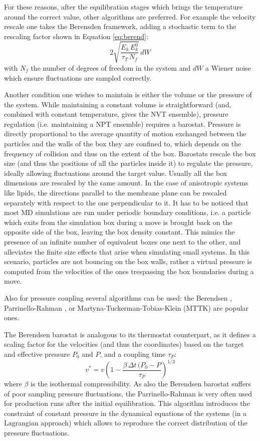 \documentclass[graybox]{svmult}
\begin{document}
For these reasons, after the equilibration stages which brings the temperature around the correct value, other algorithms are preferred. For example the velocity rescale one \cite{Bussi2007} takes the Berensden framework, adding a stochastic term to the rescaling factor shown in Equation \ref{eq:berend}:
\begin{equation}
    2 \sqrt{\frac{E_k\,E_k^0}{\tau_T\,N_f}}\, dW
\end{equation}
with $N_f$ the number of degrees of freedom in the system and $dW$ a Wiener noise \citep{Durrett2010} which ensure fluctuations are sampled correctly.

Another condition one wishes to maintain is either the volume or the pressure of the system. While maintaining a constant volume is straightforward (and, combined with constant temperature, gives the NVT ensemble), pressure regulation (i.e. maintaining a NPT ensemble) requires a barostat.
%
Pressure is directly proportional to the average quantity of motion exchanged between the particles and the walls of the box they are confined to, which depends on the frequency of collision and thus on the extent of the box. Barostats rescale the box size (and thus the positions of all the particles inside it) to regulate the pressure, ideally allowing fluctuations around the target value.
%
Usually all the box dimensions are rescaled by the same amount. In the case of anisotropic systems like lipids, the directions parallel to the membrane plane can be rescaled separately with respect to the one perpendicular to it.
%
It has to be noticed that most MD simulations are run under periodic boundary conditions, i.e. a particle which exits from the simulation box during a move is brought back on the opposite side of the box, leaving the box density constant. This mimics the presence of an infinite number of equivalent boxes one next to the other, and alleviates the finite size effects that arise when simulating small systems.
%
In this scenario, particles are not bouncing on the box walls, rather a virtual pressure is computed from the velocities of the ones trespassing the box boundaries during a move.

Also for pressure coupling several algorithms can be used: the Berendsen \cite{Berendsen1984}, Parrinello-Rahman \cite{Parrinello1981}, or Martyna-Tuckerman-Tobias-Klein (MTTK) \cite{Martyna1996} are popular ones.

The Berendsen barostat is analogous to its thermostat counterpart, as it defines a scaling factor for the velocities (and thus the coordinates) based on the target and effective pressure $P_0$ and $P$, and a coupling time $\tau_P$:
\begin{equation}
    v^* = v \left( 1 - \frac{\beta \, \Delta t \, (P_0 - P}{\tau_P} \right)^{1/3}
\end{equation}
where $\beta$ is the isothermal compressibility. As also the Berendsen barostat suffers of poor sampling pressure fluctuations, the Parrinello-Rahman \cite{Parrinello1981} is very often used for production runs after the initial equilibration. This algorithm introduces the constraint of constant pressure in the dynamical equations of the systems (in a Lagrangian approach) which allows to reproduce the correct distribution of the pressure fluctuations.
\end{document}
